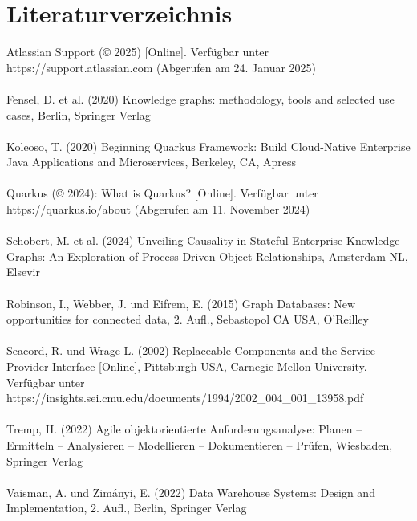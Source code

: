 \documentclass[10pt]{article}
\begin{document}
\section{Literaturverzeichnis}
Atlassian Support (© 2025) [Online]. Verfügbar unter https://support.atlassian.com (Abgerufen am 24. Januar 2025)\\\\
Fensel, D. et al. (2020) Knowledge graphs: methodology, tools and selected use cases, Berlin, Springer Verlag\\\\
Koleoso, T. (2020) Beginning Quarkus Framework: Build Cloud-Native Enterprise Java Applications and Microservices, Berkeley, CA, Apress\\\\
Quarkus (© 2024): What is Quarkus? [Online]. Verfügbar unter https://quarkus.io/about (Abgerufen am 11. November 2024)\\\\
Schobert, M. et al. (2024) Unveiling Causality in Stateful Enterprise Knowledge Graphs: An Exploration of Process-Driven Object Relationships, Amsterdam NL, Elsevir\\\\
Robinson, I., Webber, J. und Eifrem, E. (2015) Graph Databases: New opportunities for connected data, 2. Aufl., Sebastopol CA USA, O'Reilley\\\\
Seacord, R. und Wrage L. (2002) Replaceable Components and the Service Provider Interface [Online], Pittsburgh USA, Carnegie Mellon University. Verfügbar unter https://insights.sei.cmu.edu/documents/1994/2002\_004\_001\_13958.pdf\\\\
Tremp, H. (2022)  Agile objektorientierte Anforderungsanalyse:  Planen – Ermitteln – Analysieren – Modellieren – Dokumentieren – Prüfen, Wiesbaden, Springer Verlag\\\\
Vaisman, A. und Zimányi, E. (2022) Data Warehouse Systems: Design and Implementation, 2. Aufl., Berlin, Springer Verlag\\\\
\end{document}
